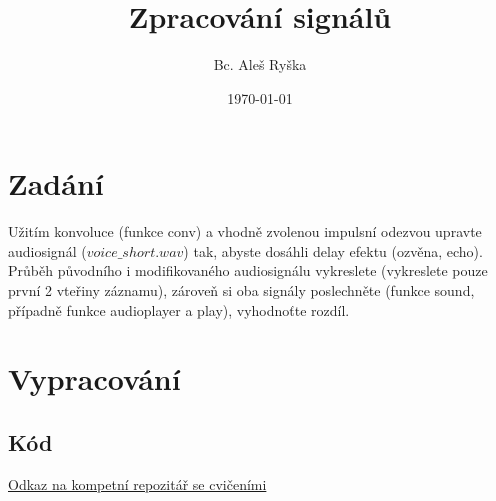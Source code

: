 \documentclass{article}
\title{Zpracování signálů} %
\author{Bc. Aleš Ryška} %
\date{\today} %
\begin{document}
\maketitle %



\section{Zadání}
Užitím konvoluce (funkce conv) a vhodně zvolenou impulsní odezvou upravte audiosignál ($voice\_short.wav$) tak, abyste dosáhli delay efektu (ozvěna, echo).\\
Průběh původního i modifikovaného audiosignálu vykreslete (vykreslete pouze první 2 vteřiny záznamu), zároveň si oba signály poslechněte (funkce sound, případně funkce audioplayer a play), vyhodnoťte rozdíl.
\newpage
\section{Vypracování}
\subsection{Kód}

\href{https://github.com/AleshR/AP8ZS}{Odkaz na kompetní repozitář se cvičeními}
\end{document}
